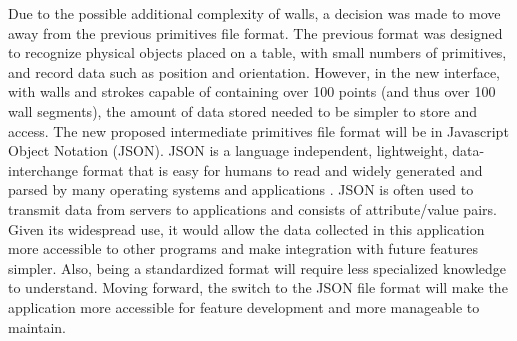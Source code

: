 Due to the possible additional complexity of walls, a decision was made to move away from the previous primitives file format. The previous format was designed to recognize physical objects placed on a table, with small numbers of primitives, and record data such as position and orientation. However, in the new interface, with walls and strokes capable of containing over 100 points (and thus over 100 wall segments), the amount of data stored needed to be simpler to store and access. The new proposed intermediate primitives file format will be in Javascript Object Notation (JSON). JSON is a language independent, lightweight, data-interchange format that is easy for humans to read and widely generated and parsed by many operating systems and applications \cite{json}. JSON is often used to transmit data from servers to applications and consists of attribute/value pairs. Given its widespread use, it would allow the data collected in this application more accessible to other programs and make integration with future features simpler. Also, being a standardized format will require less specialized knowledge to understand. Moving forward, the switch to the JSON file format will make the application more accessible for feature development and more manageable to maintain. 





